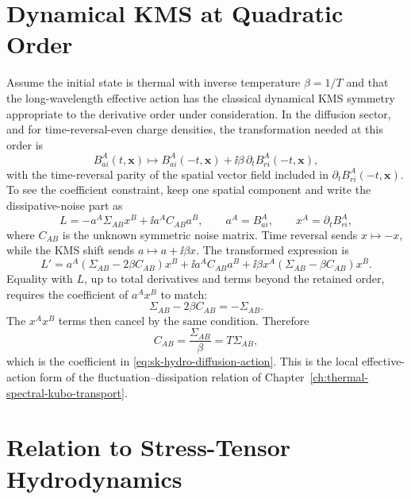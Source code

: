 \section{Dynamical KMS at Quadratic Order}

Assume the initial state is thermal with inverse temperature
\(\beta=1/T\) and that the long-wavelength effective action has the
classical dynamical KMS symmetry appropriate to the derivative order under
consideration.  In the diffusion sector, and for time-reversal-even charge
densities, the transformation needed at this order is
\begin{equation}
  B^A_{ai}(t,\mathbf x)
  \mapsto
  B^A_{ai}(-t,\mathbf x)
  +\ii\beta\,\partial_tB^A_{ri}(-t,\mathbf x),
  \label{eq:sk-hydro-classical-kms-ba}
\end{equation}
with the time-reversal parity of the spatial vector field included in
\(\partial_tB^A_{ri}(-t,\mathbf x)\).  To see the coefficient constraint,
keep one spatial component and write the dissipative-noise part as
\[
  L=-a^A\Sigma_{AB}x^B+\ii a^AC_{AB}a^B,
  \qquad
  a^A=B^A_{ai},
  \qquad
  x^A=\partial_tB^A_{ri},
\]
where \(C_{AB}\) is the unknown symmetric noise matrix.  Time reversal sends
\(x\mapsto -x\), while the KMS shift sends
\(a\mapsto a+\ii\beta x\).  The transformed expression is
\[
  L'
  =
  a^A(\Sigma_{AB}-2\beta C_{AB})x^B
  +\ii a^AC_{AB}a^B
  +\ii\beta x^A(\Sigma_{AB}-\beta C_{AB})x^B .
\]
Equality with \(L\), up to total derivatives and terms beyond the retained
order, requires the coefficient of \(a^Ax^B\) to match:
\[
  \Sigma_{AB}-2\beta C_{AB}=-\Sigma_{AB}.
\]
The \(x^Ax^B\) terms then cancel by the same condition.  Therefore
\begin{equation}
  C_{AB}=\frac{\Sigma_{AB}}{\beta}=T\Sigma_{AB},
  \label{eq:sk-hydro-kms-noise-coefficient}
\end{equation}
which is the coefficient in \eqref{eq:sk-hydro-diffusion-action}.  This is
the local effective-action form of the fluctuation--dissipation relation of
Chapter~\ref{ch:thermal-spectral-kubo-transport}.

\section{Relation to Stress-Tensor Hydrodynamics}

